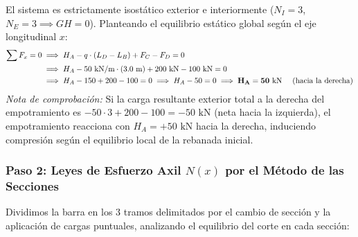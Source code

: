 El sistema es estrictamente isostático exterior e interiormente ($N_I = 3$, $N_E = 3 \implies GH = 0$). Planteando el equilibrio estático global según el eje longitudinal $x$:
\begin{align}
    \sum F_x = 0 & \implies H_A - q \cdot (L_D - L_B) + F_C - F_D = 0 \notag \\
                 & \implies H_A - 50\text{ kN/m} \cdot (3.0\text{ m}) + 200\text{ kN} - 100\text{ kN} = 0 \notag \\
                 & \implies H_A - 150 + 200 - 100 = 0 \implies H_A - 50 = 0 \implies \mathbf{H_A = 50\text{ kN \quad (\text{hacia la derecha})}}
\end{align}
\textit{Nota de comprobación:} Si la carga resultante exterior total a la derecha del empotramiento es $-50 \cdot 3 + 200 - 100 = -50\text{ kN}$ (neta hacia la izquierda), el empotramiento reacciona con $H_A = +50\text{ kN}$ hacia la derecha, induciendo compresión según el equilibrio local de la rebanada inicial.

\subsubsection*{Paso 2: Leyes de Esfuerzo Axil $N(x)$ por el Método de las Secciones}
Dividimos la barra en los 3 tramos delimitados por el cambio de sección y la aplicación de cargas puntuales, analizando el equilibrio del corte en cada sección:


\begin{center}
\end{center}

